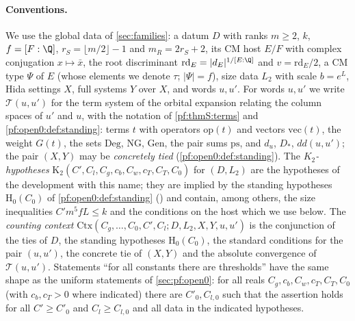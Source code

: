 \paragraph{Conventions.}
We use the global data of \cref{sec:families}: a datum $D$ with ranks $m\ge2$, $k$, $f=[F:\Q]$,
$r_S=\lfloor m/2\rfloor-1$ and $m_R=2r_S+2$, its CM host $E/F$ with complex conjugation $x\mapsto\bar x$, the root discriminant
$\mathrm{rd}_E=|d_E|^{1/[E:\Q]}$ and $v=\mathrm{rd}_E/2$, a CM type $\Psi$ of $E$ (whose elements we denote
$\tau$; $|\Psi|=f$), size data $L_2$ with scale $b=e^L$, Hida settings $X$, full systems $Y$ over $X$, and
words $u,u'$. For words $u,u'$ we write $\mathcal T(u,u')$ for the term system of the orbital expansion
relating the column spaces of $u'$ and $u$, with the notation of \cref{pf:thmS:terms} and
\cref{pf:open0:def:standing}: terms $t$ with operators $\mathrm{op}(t)$ and vectors $\mathrm{vec}(t)$, the
weight $G(t)$, the sets $\mathrm{Deg}$, $\mathrm{NG}$, $\mathrm{Gen}$, the pair sums $\mathrm{ps}$, and
$d_u$, $D_*$, $dd(u,u')$; the pair $(X,Y)$ may be \emph{concretely tied} (\cref{pf:open0:def:standing}).
The \emph{$K_2$-hypotheses} $\mathrm{K}_2(C',C_l,C_g,c_b,C_w,c_T,C_T,C_0)$ for $(D,L_2)$ are the hypotheses
of the development with this name; they are implied by the standing hypotheses $\mathrm{H}_0(C_0)$ of
\cref{pf:open0:def:standing} () and
contain, among others, the size inequalities $C'm^5fL\le k$ and the conditions on the host which we use
below. The \emph{counting context} $\mathrm{Ctx}(C_g,\dots,C_0,C',C_l;D,L_2,X,Y,u,u')$ is the conjunction
of the ties of $D$, the standing hypotheses $\mathrm{H}_0(C_0)$, the standard conditions for the pair
$(u,u')$, the concrete tie of $(X,Y)$ and the absolute convergence of $\mathcal T(u,u')$. Statements
``for all constants there are thresholds'' have the same shape as the uniform statements of
\cref{sec:pf:open0}: for all reals $C_g,c_b,C_w,c_T,C_T,C_0$ (with $c_b,c_T>0$ where indicated) there are
$C'_0,C_{l,0}$ such that the assertion holds for all $C'\ge C'_0$ and $C_l\ge C_{l,0}$ and all data in the
indicated hypotheses.

